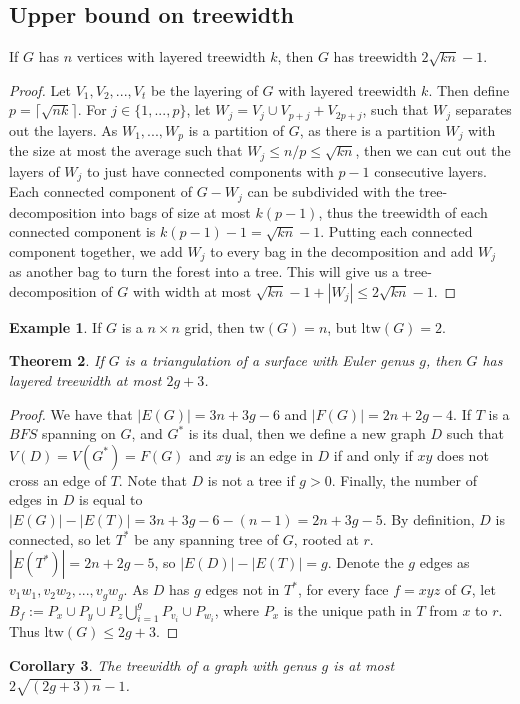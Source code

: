 \documentclass[]{article}
\newcommand{\tw}{\text{tw}}
\newcommand{\ltw}{\text{ltw}}
\newtheorem{theorem}{Theorem}
\newtheorem{corollary}[theorem]{Corollary}
\theoremstyle{definition}
\newtheorem{example}[theorem]{Example}
\numberwithin{theorem}{section}
\numberwithin{equation}{section}
\begin{document}
\subsection{Upper bound on treewidth}
If $G$ has $n$ vertices with layered treewidth $k$, then $G$ has treewidth $2 \sqrt{kn} - 1$.
\begin{proof}
	Let $V_1, V_2, ..., V_t$ be the layering of $G$ with layered treewidth $k$. Then define $p = \lceil \sqrt{nk} \rceil$. For $j \in \lbrace 1, ..., p \rbrace$, let $W_j = V_j \cup V_{p + j} + V_{2p + j}$, such that $W_j$ separates out the layers. As $W_1, ..., W_p$ is a partition of $G$, as there is a partition $W_j$ with the size at most the average such that $W_j \leq n/p \leq \sqrt{kn}$, then we can cut out the layers of $W_j$ to just have connected components with $p-1$ consecutive layers. Each connected component of $G - W_j$ can be subdivided with the tree-decomposition into bags of size at most $k(p-1)$, thus the treewidth of each connected component is $k(p-1) - 1 = \sqrt{kn} - 1$. Putting each connected component together, we add $W_j$ to every bag in the decomposition and add $W_j$ as another bag to turn the forest into a tree. This will give us a tree-decomposition of $G$ with width at most $\sqrt{kn} - 1 + |W_j| \leq 2 \sqrt{kn} - 1$. 
\end{proof}

\begin{example}
	If $G$ is a $n \times n$ grid, then $\tw(G) = n$, but $\ltw(G) = 2$. 
\end{example}

\begin{theorem}
	If $G$ is a triangulation of a surface with Euler genus $g$, then $G$ has layered treewidth at most $2g + 3$. 
\end{theorem}

\begin{proof}
	We have that $|E(G)| = 3n + 3g - 6$ and $|F(G)| = 2n + 2g - 4$. If $T$ is a $BFS$ spanning on $G$, and $G^*$ is its dual, then we define a new graph $D$ such that $V(D) = V(G^*) = F(G)$ and $xy$ is an edge in $D$ if and only if $xy$ does not cross an edge of $T$. Note that $D$ is not a tree if $g > 0 $. Finally, the number of edges in $D$ is equal to $|E(G)| - |E(T)| = 3n + 3g - 6 - (n-1) = 2n + 3g - 5$. By definition, $D$ is connected, so let $T^*$ be any spanning tree of $G$, rooted at $r$. $|E(T^*)| = 2n + 2g - 5$, so $|E(D)| - |E(T)| = g$. Denote the $g$ edges as $v_1w_1, v_2w_2, ..., v_gw_g$. As $D$ has $g$ edges not in $T^*$, for every face $f = xyz$ of $G$, let $B_f := P_x \cup P_y \cup P_z \bigcup_{i = 1}^g P_{v_i} \cup P_{w_i}$, where $P_x$ is the unique path in $T$ from $x$ to $r$. Thus $\ltw(G) \leq 2g + 3$. 
\end{proof}
\begin{corollary}
	The treewidth of a graph with genus $g$ is at most $2\sqrt{(2g + 3) n } -1$. 
\end{corollary}
\end{document}
